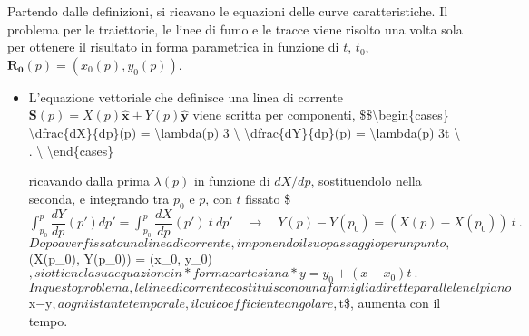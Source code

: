 \documentclass[letterpaper,10pt,italian]{jupyterBook}
\begin{document}
\sphinxAtStartPar
Partendo dalle definizioni, si ricavano le equazioni delle curve
caratteristiche. Il problema per le traiettorie, le linee di fumo e le
tracce viene risolto una volta sola per ottenere il risultato in forma
parametrica in funzione di \(t\), \(t_0\), \(\bm{R_0}(p) = (x_0(p), y_0(p))\).
\begin{itemize}
\item {} 
\sphinxAtStartPar
{} L’equazione vettoriale che definisce una
linea di corrente
\(\bm{S}(p) = X(p) \bm{\hat{x}} + Y(p) \bm{\hat{y}}\) viene scritta
per componenti, \$\$\textbackslash{}begin\{cases\}
\textbackslash{}dfrac\{dX\}\{dp\}(p) = \textbackslash{}lambda(p) 3 \textbackslash{}
\textbackslash{}dfrac\{dY\}\{dp\}(p) = \textbackslash{}lambda(p) 3t  \textbackslash{} . \textbackslash{}
\textbackslash{}end\{cases\}

\sphinxAtStartPar
ricavando dalla prima \(\lambda(p)\) in funzione di \(dX/dp\),
sostituendolo nella seconda, e integrando tra \(p_0\) e \(p\), con \(t\)
fissato
\$\(\int_{p_0}^{p}\dfrac{d Y}{dp}(p') dp' = \int_{p_0}^{p}\dfrac{d X}{dp}(p') \ t \ dp' \quad \rightarrow \quad Y(p) - Y(p_0) = ( X(p) - X(p_0) ) \ t \ .\)\(
Dopo aver fissato una linea di corrente, imponendo il suo passaggio
per un punto, \)(X(p\_0), Y(p\_0)) = (x\_0, y\_0)\(, si ottiene la sua
equazione in *forma cartesiana* \)\(y = y_0 + ( x - x_0 ) t \ .\)\( In
questo problema, le linee di corrente costituiscono una famiglia di
rette parallele nel piano \)x\(-\)y\(, a ogni istante temporale, il cui
coefficiente angolare, \)t\$, aumenta con il tempo.


\end{itemize}
\end{document}
